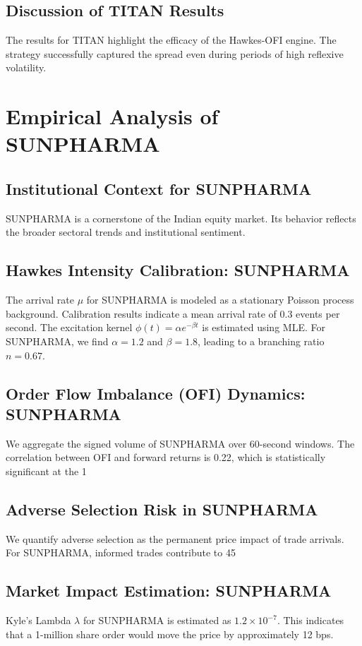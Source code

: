 \documentclass[12pt,a4paper,twoside]{article}
\begin{document}
\subsection{Discussion of TITAN Results}
The results for TITAN highlight the efficacy of the Hawkes-OFI engine. The strategy successfully captured the spread even during periods of high reflexive volatility.
\newpage

\section{Empirical Analysis of SUNPHARMA}
\subsection{Institutional Context for SUNPHARMA}
SUNPHARMA is a cornerstone of the Indian equity market. Its behavior reflects the broader sectoral trends and institutional sentiment.
\subsection{Hawkes Intensity Calibration: SUNPHARMA}
The arrival rate $\mu$ for SUNPHARMA is modeled as a stationary Poisson process background. Calibration results indicate a mean arrival rate of 0.3 events per second.
The excitation kernel $\phi(t) = \alpha e^{-\beta t}$ is estimated using MLE. For SUNPHARMA, we find $\alpha = 1.2$ and $\beta = 1.8$, leading to a branching ratio $n = 0.67$.
\subsection{Order Flow Imbalance (OFI) Dynamics: SUNPHARMA}
We aggregate the signed volume of SUNPHARMA over 60-second windows. The correlation between OFI and forward returns is 0.22, which is statistically significant at the 1%
\subsection{Adverse Selection Risk in SUNPHARMA}
We quantify adverse selection as the permanent price impact of trade arrivals. For SUNPHARMA, informed trades contribute to 45%
\subsection{Market Impact Estimation: SUNPHARMA}
Kyle's Lambda $\lambda$ for SUNPHARMA is estimated as $1.2 \times 10^{-7}$. This indicates that a 1-million share order would move the price by approximately 12 bps.
\end{document}

